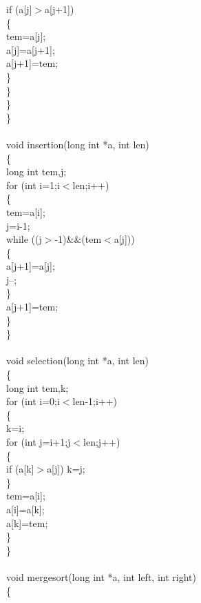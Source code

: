 \documentclass{article}
\begin{document}
            if (a[j]$>$a[j+1])\\
            \{\\
                tem=a[j];\\
                a[j]=a[j+1];\\
                a[j+1]=tem;\\
            \}\\
        \}\\
    \}\\
\}\\
\\
void insertion(long int *a, int len)\\
\{\\
    long int tem,j;\\
    for (int i=1;i$<$len;i++)\\
    \{\\
        tem=a[i];\\
        j=i-1;\\
        while ((j$>$-1)\&\&(tem$<$a[j]))\\
        \{\\
            a[j+1]=a[j];\\
            j--;\\
        \}\\
        a[j+1]=tem;\\
    \}\\
\}\\
\\
void selection(long int *a, int len)\\
\{\\
    long int tem,k;\\
    for (int i=0;i$<$len-1;i++)\\
    \{\\
        k=i;\\
        for (int j=i+1;j$<$len;j++)\\
        \{\\
            if (a[k]$>$a[j]) k=j;\\
        \}\\
        tem=a[i];\\
        a[i]=a[k];\\
        a[k]=tem;\\
    \}\\
\}\\
\\
void mergesort(long int *a, int left, int right)\\
\{\\
\end{document}
